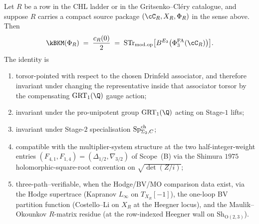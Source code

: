 \begin{theorem}
\label{thm:bl-master-kappa-bkm-chain-level}
Let $R$ be a row in the CHL ladder or in the Gritsenko--Cl\'ery
catalogue, and suppose $R$ carries a compact source package
$(\cC_R,X_R,\Phi_R)$ in the sense above. Then
\begin{equation}
\label{eq:master-chain-level-chapter}
 \kBKM(\Phi_R)
 \;=\; \frac{c_R(0)}{2}
 \;=\; \STr_{\modop}\bigl[B^{E_3}\bigl(\PhiFA_3(\cC_R)\bigr)\bigr].
\end{equation}
The identity is
\begin{enumerate}[label=\textup{(\roman*)}]
\item torsor-pointed with respect to the chosen Drinfeld associator, and
therefore invariant under changing the representative inside that
associator torsor by the compensating $\GRTone(\Q)$ gauge action;
\item invariant under the pro-unipotent group $\GRTone(\Q)$ acting on
Stage-$1$ lifts;
\item invariant under Stage-$2$ specialisation
$\mathrm{Sp}^{\mathrm{ch}}_{\Sigma_2, C}$;
\item compatible with the multiplier-system structure at the two
half-integer-weight entries $(F_{4, 1}, F_{1, 4}) = (\Delta_{1/2},
\nabla_{3/2})$ of Scope~(B) via the Shimura $1975$ holomorphic-square-root
convention on $\sqrt{\det(Z/i)}$;
\item three-path--verifiable, when the Hodge/BV/MO comparison data exist,
via the Hodge supertrace
(Kapranov $L_\infty$ on $T_{X_R}[-1]$), the one-loop BV partition
function (Costello--Li on $X_R$ at the Heegner locus), and the
Maulik--Okounkov $R$-matrix residue (at the row-indexed Heegner wall
on $\mathrm{Sh}_{\mathrm{O}(2, 3)}$).
\end{enumerate}
\end{theorem}

